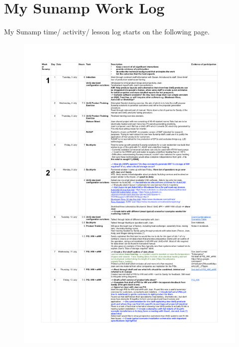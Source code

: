 
\chapter{My Sunamp Work Log} %

\label{App:Log} %


%

My Sunamp time/ activity/ lesson log starts on the following page.

\begin{figure}
	\centering
	\includegraphics[height=\textheight]{Appendices/Log_01.png}
\end{figure}


